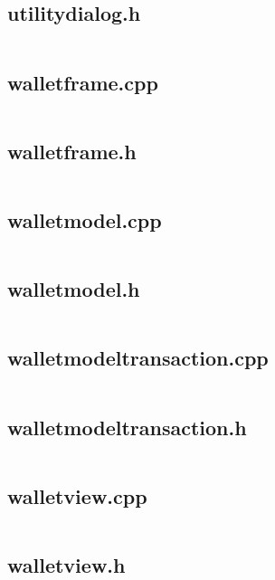 \documentclass{article}
\begin{document}
\subsection{utilitydialog.h}
\inputminted{cpp}{/home/dufferzafar/dev/@clones/bitcoin/src/qt/utilitydialog.h}
\newpage

\subsection{walletframe.cpp}
\inputminted{cpp}{/home/dufferzafar/dev/@clones/bitcoin/src/qt/walletframe.cpp}
\newpage

\subsection{walletframe.h}
\inputminted{cpp}{/home/dufferzafar/dev/@clones/bitcoin/src/qt/walletframe.h}
\newpage

\subsection{walletmodel.cpp}
\inputminted{cpp}{/home/dufferzafar/dev/@clones/bitcoin/src/qt/walletmodel.cpp}
\newpage

\subsection{walletmodel.h}
\inputminted{cpp}{/home/dufferzafar/dev/@clones/bitcoin/src/qt/walletmodel.h}
\newpage

\subsection{walletmodeltransaction.cpp}
\inputminted{cpp}{/home/dufferzafar/dev/@clones/bitcoin/src/qt/walletmodeltransaction.cpp}
\newpage

\subsection{walletmodeltransaction.h}
\inputminted{cpp}{/home/dufferzafar/dev/@clones/bitcoin/src/qt/walletmodeltransaction.h}
\newpage

\subsection{walletview.cpp}
\inputminted{cpp}{/home/dufferzafar/dev/@clones/bitcoin/src/qt/walletview.cpp}
\newpage

\subsection{walletview.h}
\inputminted{cpp}{/home/dufferzafar/dev/@clones/bitcoin/src/qt/walletview.h}
\newpage
\end{document}
